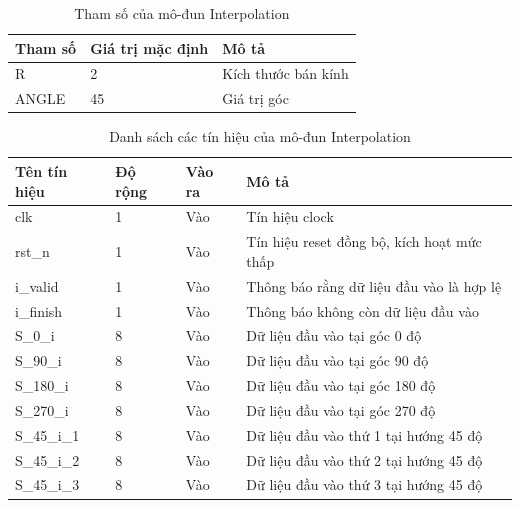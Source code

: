 \begin{table}[!ht]
    \centering
    \renewcommand{\arraystretch}{1.3} %
        \caption{Tham số của mô-đun Interpolation}
    \begin{tabular}{|p{3cm} p{4cm} p{8cm}|}
        \hline
        \rowcolor{gray!30}
        \textbf{Tham số } & \textbf{Giá trị mặc định}  & \textbf{Mô tả} \\
        \hline
        R & 2 & Kích thước bán kính 
        \\ \hline
        ANGLE & 45 & Giá trị góc
        \\
        \hline
    \end{tabular}

    \label{tab:paramListInterpolation}
\end{table}
\begin{table}[H]
    \centering
    \renewcommand{\arraystretch}{1.2}
        \caption{Danh sách các tín hiệu của mô-đun Interpolation}
    \begin{tabular}{|p{3cm} p{2cm} p{2cm} p{8cm}|}
        \hline
        \rowcolor{gray!30}
        \textbf{Tên tín hiệu} & \textbf{Độ rộng} & \textbf{Vào ra} & \textbf{Mô tả} \\
        \hline
        clk & 1 & Vào & Tín hiệu clock \\
        \hline
        rst\_n & 1 & Vào & Tín hiệu reset đồng bộ, kích hoạt mức thấp \\
        \hline 
        i\_valid & 1 & Vào & Thông báo rằng dữ liệu đầu vào là hợp lệ \\
        \hline
        i\_finish & 1 & Vào & Thông báo không còn dữ liệu đầu vào \\
        \hline
        S\_0\_i & 8 & Vào & Dữ liệu đầu vào tại góc 0 độ \\
        \hline
        S\_90\_i & 8 & Vào & Dữ liệu đầu vào tại góc 90 độ \\
        \hline
        S\_180\_i & 8 & Vào & Dữ liệu đầu vào tại góc 180 độ \\
        \hline
        S\_270\_i & 8 & Vào & Dữ liệu đầu vào tại góc 270 độ \\
        \hline
        S\_45\_i\_1 & 8 & Vào & Dữ liệu đầu vào thứ 1 tại hướng 45 độ \\
        \hline
        S\_45\_i\_2 & 8 & Vào & Dữ liệu đầu vào thứ 2 tại hướng 45 độ \\
        \hline
        S\_45\_i\_3 & 8 & Vào & Dữ liệu đầu vào thứ 3 tại hướng 45 độ \\
        \hline

\end{tabular}
\end{table}
